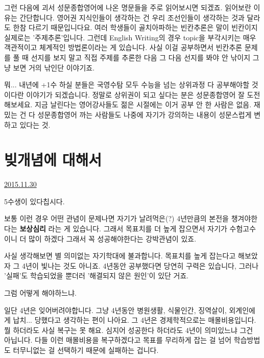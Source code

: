 그런 다음에 괴서 성문종합영어에 나온 명문들을 주로 읽어보시면 되겠죠.
읽어보란 이유는 간단합니다. 영어권 지식인들이 생각하는 건 우리 조선인들이 생각하는 것과 달라도 한참 다르기 때문입니다요.
여러 학생들이 골치아파하는 빈칸추론은 말이 빈칸이지 실제로는 '주제추론'입니다.
그런데 English Writing의 경우 topic을 부각시키는 매우 객관적이고 체계적인 방법론이라는 게 있습니다.
사실 이걸 공부하면서 빈칸추론 문제를 풀 때 선지를 보지 말고 직접 주제를 추론한 다음 그 다음 선지를 봐야 안 낚이지
그냥 보면 거의 낚인단 이야기죠.
\vspace{5mm}

뭐... 내년에 +1수 하실 분들은 국영수탐 모두 수능을 넘는 상위과정 다 공부해야할 것이다란 이야기가 되겠습니다.
정말로 상위권이 되고 싶다는 분은 성문종합영어 잘 도전해보세요. 지금 날린다는 영어강사들도 젊은 시절에는 이거 공부 안 한 사람은 없음.
재밌는 건 다 성문종합영어 까는 사람들도 나중에 자기가 강의하는 내용이 성문스럽게 변하고 있다는 것.
\vspace{5mm}










\section{빚개념에 대해서}
\href{https://www.kockoc.com/Apoc/518747}{2015.11.30}

\vspace{5mm}

5수생이 있다칩시다.
\vspace{5mm}

보통 이런 경우 어떤 관념이 문제나면
자기가 날려먹은(?) 4년만큼의 본전을 챙겨야한다는 \textbf{보상심리} 라는 게 있습니다.
그래서 목표치를 더 높게 잡으면서 자기가 수험고수이니 더 많이 하겠다 그래서 꼭 성공해야한다는 강박관념이 있죠.
\vspace{5mm}

사실 생각해보면 별 의미없는 자기학대에 불과합니다.
목표치를 높게 잡는다고 해보았자 그 4년이 빛나는 것도 아니죠.
4년동안 공부했다면 당연히 구력은 있습니다, 그러나 '실패'도 학습되었을 뿐더러 '해결되지 않은 원인'이 있단 거죠.
\vspace{5mm}

그럼 어떻게 해야하느냐.
\vspace{5mm}

일단 4년은 잊어버려야합니다. 그냥 4년동안 병원생활, 식물인간, 징역살이, 외계인에게 납치... 당했다고 생각하는 편이 나아요.
그 4년은 경제학적으로는 매몰비용입니다. 뭘 하더라도 사실 복구는 못 해요. 심지어 성공한다 하더라도 4년이 의미있느냐 그건 아닙니다.
다들 이런 매몰비용을 복구하겠다고 목표를 무리하게 잡는 걸 넘어 학습방법도 터무니없는 걸 선택하기 때문에 실패하는 겁니다.
\vspace{5mm}

